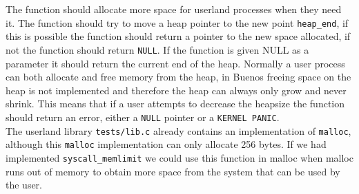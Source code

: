 \documentclass[11pt]{article}
\begin{document}
    The function should allocate more space for userland processes when they
    need it.  The function should try to move a heap pointer to the new point
    \texttt{heap\_end}, if this is possible the function should return a pointer
    to the new space allocated, if not the function should return \texttt{NULL}.
    If the function is given NULL as a parameter it should return the current
    end of the heap.  Normally a user process can both allocate and free memory
    from the heap, in Buenos freeing space on the heap is not implemented and
    therefore the heap can always only grow and never shrink.  This means that
    if a user attempts to decrease the heapsize the function should return an
    error, either a \texttt{NULL} pointer or a \texttt{KERNEL PANIC}.  \\

    The userland library \texttt{tests/lib.c} already contains an implementation
    of \texttt{malloc}, although this \texttt{malloc} implementation can only
    allocate 256 bytes.  If we had implemented \texttt{syscall\_memlimit} we
    could use this function in malloc when malloc runs out of memory to obtain
    more space from the system that can be used by the user.
\end{document}
